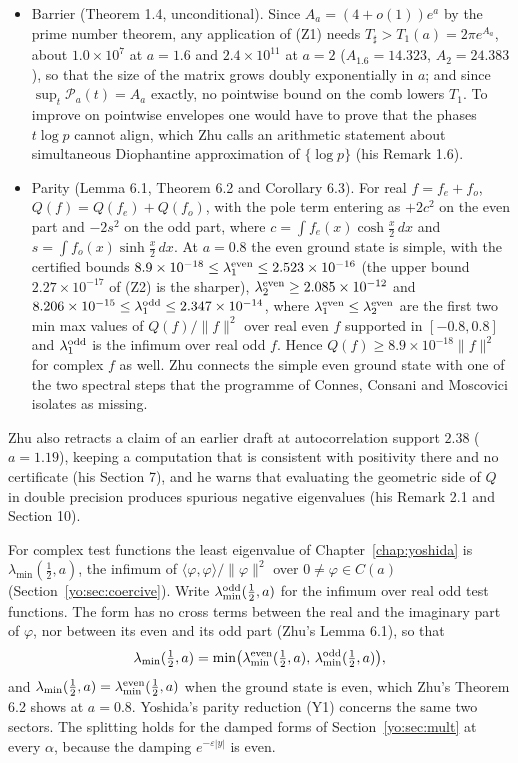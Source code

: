 \begin{itemize}
\item[(Z5)] Barrier (Theorem 1.4, unconditional). Since $A_a=(4+o(1))e^a$ by the prime number theorem, any application of (Z1) needs $T_\sharp>T_1(a)=2\pi e^{A_a}$, about $1.0\times10^7$ at $a=1.6$ and $2.4\times10^{11}$ at $a=2$ ($A_{1.6}=14.323$, $A_2=24.383$), so that the size of the matrix grows doubly exponentially in $a$; and since $\sup_t\mathcal P_a(t)=A_a$ exactly, no pointwise bound on the comb lowers $T_1$. To improve on pointwise envelopes one would have to prove that the phases $t\log p$ cannot align, which Zhu calls an arithmetic statement about simultaneous Diophantine approximation of $\{\log p\}$ (his Remark 1.6).
\item[(Z6)] Parity (Lemma 6.1, Theorem 6.2 and Corollary 6.3). For real $f=f_e+f_o$, $Q(f)=Q(f_e)+Q(f_o)$, with the pole term entering as $+2c^2$ on the even part and $-2s^2$ on the odd part, where $c=\int f_e(x)\cosh\frac x2\,dx$ and $s=\int f_o(x)\sinh\frac x2\,dx$. At $a=0.8$ the even ground state is simple, with the certified bounds $8.9\times10^{-18}\le\lambda_1^{\rm even}\le2.523\times10^{-16}$ (the upper bound $2.27\times10^{-17}$ of (Z2) is the sharper), $\lambda_2^{\rm even}\ge2.085\times10^{-12}$ and $8.206\times10^{-15}\le\lambda_1^{\rm odd}\le2.347\times10^{-14}$, where $\lambda_1^{\rm even}\le\lambda_2^{\rm even}$ are the first two min max values of $Q(f)/\|f\|^2$ over real even $f$ supported in $[-0.8,0.8]$ and $\lambda_1^{\rm odd}$ is the infimum over real odd $f$. Hence $Q(f)\ge8.9\times10^{-18}\|f\|^2$ for complex $f$ as well. Zhu connects the simple even ground state with one of the two spectral steps that the programme of Connes, Consani and Moscovici \cite{CCM25} isolates as missing.
\end{itemize}
Zhu also retracts a claim of an earlier draft at autocorrelation support $2.38$ ($a=1.19$), keeping a computation that is consistent with positivity there and no certificate (his Section 7), and he warns that evaluating the geometric side of $Q$ in double precision produces spurious negative eigenvalues (his Remark 2.1 and Section 10).

For complex test functions the least eigenvalue of Chapter~\ref{chap:yoshida} is $\lambda_{\min}(\frac12,a)$, the infimum of $\langle\varphi,\varphi\rangle/\|\varphi\|^2$ over $0\ne\varphi\in C(a)$ (Section~\ref{yo:sec:coercive}). Write $\lambda^{\rm odd}_{\min}(\frac12,a)$ for the infimum over real odd test functions. The form has no cross terms between the real and the imaginary part of $\varphi$, nor between its even and its odd part (Zhu's Lemma 6.1), so that
\[
\lambda_{\min}(\tfrac12,a)=\min\bigl(\lambda^{\rm even}_{\min}(\tfrac12,a),\,\lambda^{\rm odd}_{\min}(\tfrac12,a)\bigr),
\]
and $\lambda_{\min}(\frac12,a)=\lambda^{\rm even}_{\min}(\frac12,a)$ when the ground state is even, which Zhu's Theorem 6.2 shows at $a=0.8$. Yoshida's parity reduction (Y1) concerns the same two sectors. The splitting holds for the damped forms of Section~\ref{yo:sec:mult} at every $\alpha$, because the damping $e^{-\varepsilon|y|}$ is even.

